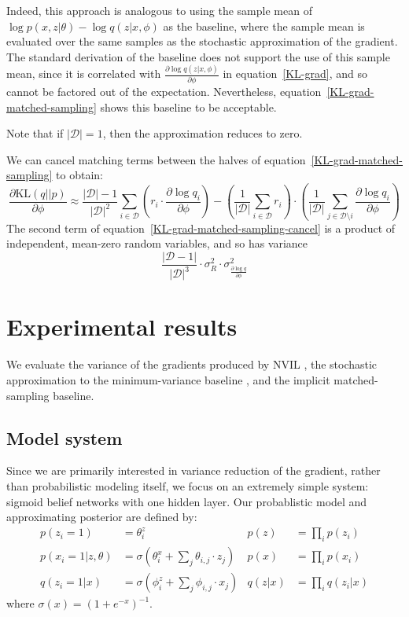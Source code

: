 \documentclass{article} %
\def\KL{\text{KL}}
\begin{document}
Indeed, this approach is analogous to using the sample mean of $\log p(x,z | \theta) - \log q(z | x, \phi)$ as the baseline, where the sample mean is evaluated over the same samples as the stochastic approximation of the gradient.  The standard derivation of the baseline does not support the use of this sample mean, since it is correlated with $\frac{\partial \log q(z | x, \phi)}{\partial \phi}$ in equation~\ref{KL-grad}, and so cannot be factored out of the expectation.  Nevertheless, equation~\ref{KL-grad-matched-sampling} shows this baseline to be acceptable.


Note that if $|\mathcal{D}| = 1$, then the approximation reduces to zero.

We can cancel matching terms between the halves of equation~\ref{KL-grad-matched-sampling} to obtain:
\begin{equation} \label{KL-grad-matched-sampling-cancel}
\frac{\partial \KL(q||p)}{\partial \phi}  \approx \frac{|\mathcal{D}| - 1}{|\mathcal{D}|^2} \sum_{i \in \mathcal{D}}\left( r_i \cdot \frac{\partial \log q_i}{\partial \phi} \right) - \left( \frac{1}{|\mathcal{D}|} \sum_{i \in \mathcal{D}} r_i \right) \cdot \left( \frac{1}{|\mathcal{D}|} \sum_{j \in \mathcal{D} \setminus i} \frac{\partial \log q_i}{\partial \phi} \right)
\end{equation}
The second term of equation~\ref{KL-grad-matched-sampling-cancel} is a product of independent, mean-zero random variables, and so has variance
\begin{equation*}
\frac{|\mathcal{D} - 1|}{|\mathcal{D}|^3} \cdot \sigma_R^2 \cdot \sigma_{\frac{\partial \log q}{\partial \phi}}^2
\end{equation*}



\section{Experimental results}

We evaluate the variance of the gradients produced by NVIL \cite{mnih2014neural}, the stochastic approximation to the minimum-variance baseline \cite{weaver2001optimal, greensmith2004variance}, and the implicit matched-sampling baseline.

\subsection{Model system}
   
Since we are primarily interested in variance reduction of the gradient, rather than probabilistic modeling itself, we focus on an extremely simple system: sigmoid belief networks \cite{neal1992connectionist} with one hidden layer.  Our probablistic model and approximating posterior are defined by:
\begin{align*}
p(z_i = 1) &= \theta_i^z &
p(z) &= \prod_i p(z_i) \\
p(x_i=1 |z, \theta) &= \sigma \left( \theta_i^x + \sum_j \theta_{i,j} \cdot z_j \right) &
p(x) &= \prod_i p(x_i) \\
q(z_i = 1 | x) &= \sigma \left( \phi_i^z + \sum_j \phi_{i,j} \cdot x_j \right) &
q(z | x) &= \prod_i q(z_i | x)
\end{align*}
where $\sigma(x) = (1 + e^{-x})^{-1}$.
\end{document}
